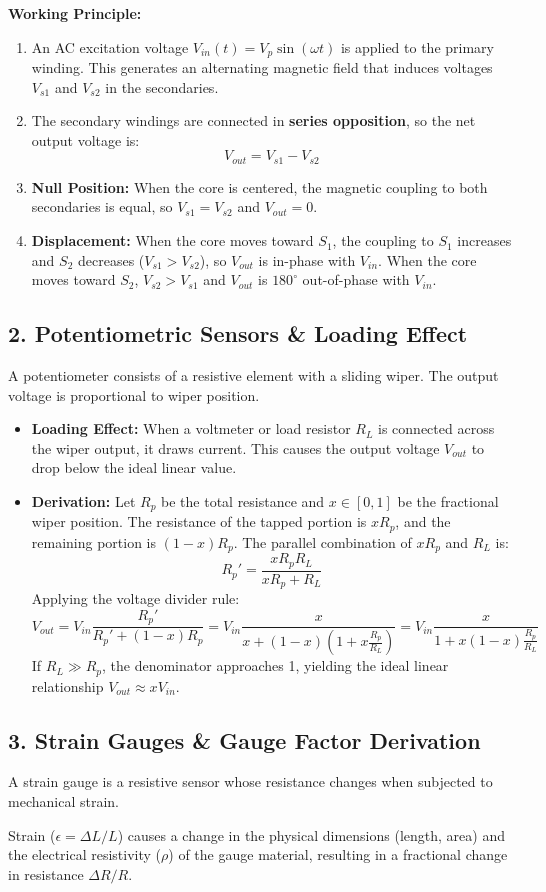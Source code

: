 \documentclass[12pt,a4paper]{article}
\begin{document}
\textbf{Working Principle:}
\begin{enumerate}[label=\textbf{\alph*.}, leftmargin=*]
  \item An AC excitation voltage $V_{in}(t) = V_p \sin(\omega t)$ is applied to the primary winding. This generates an alternating magnetic field that induces voltages $V_{s1}$ and $V_{s2}$ in the secondaries.
  \item The secondary windings are connected in \textbf{series opposition}, so the net output voltage is:
  \[
  V_{out} = V_{s1} - V_{s2}
  \]
  \item \textbf{Null Position:} When the core is centered, the magnetic coupling to both secondaries is equal, so $V_{s1} = V_{s2}$ and $V_{out} = 0$.
  \item \textbf{Displacement:} When the core moves toward $S_1$, the coupling to $S_1$ increases and $S_2$ decreases ($V_{s1} > V_{s2}$), so $V_{out}$ is in-phase with $V_{in}$. When the core moves toward $S_2$, $V_{s2} > V_{s1}$ and $V_{out}$ is $180^\circ$ out-of-phase with $V_{in}$.
\end{enumerate}

\subsection{2. Potentiometric Sensors \& Loading Effect}
A potentiometer consists of a resistive element with a sliding wiper. The output voltage is proportional to wiper position.
\begin{itemize}[leftmargin=*, itemsep=2pt]
  \item \textbf{Loading Effect:} When a voltmeter or load resistor $R_L$ is connected across the wiper output, it draws current. This causes the output voltage $V_{out}$ to drop below the ideal linear value.
  \item \textbf{Derivation:} Let $R_p$ be the total resistance and $x \in [0, 1]$ be the fractional wiper position. The resistance of the tapped portion is $x R_p$, and the remaining portion is $(1-x)R_p$. The parallel combination of $x R_p$ and $R_L$ is:
  \[
  R_p' = \frac{x R_p R_L}{x R_p + R_L}
  \]
  Applying the voltage divider rule:
  \[
  V_{out} = V_{in} \frac{R_p'}{R_p' + (1-x)R_p} = V_{in} \frac{x}{x + (1-x)(1 + x \frac{R_p}{R_L})} = V_{in} \frac{x}{1 + x(1-x)\frac{R_p}{R_L}}
  \]
  If $R_L \gg R_p$, the denominator approaches 1, yielding the ideal linear relationship $V_{out} \approx x V_{in}$.
\end{itemize}

\subsection{3. Strain Gauges \& Gauge Factor Derivation}
A strain gauge is a resistive sensor whose resistance changes when subjected to mechanical strain.
\begin{tcolorbox}[defbox, title={\textbf{Piezoresistive Effect and Strain}}]
Strain ($\epsilon = \Delta L / L$) causes a change in the physical dimensions (length, area) and the electrical resistivity ($\rho$) of the gauge material, resulting in a fractional change in resistance $\Delta R / R$.
\end{tcolorbox}
\end{document}
